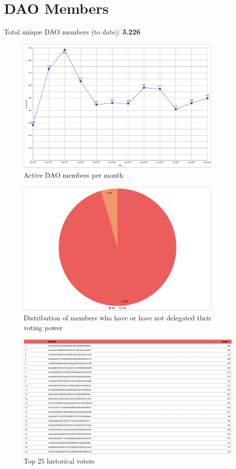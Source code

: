 \documentclass[MSE,Master,english]{twbook}%
\begin{document}
\section{DAO Members}
Total unique DAO members (to date): \textbf{3.226}

\begin{figure}[H]
  \centering
  \includegraphics[width=0.90\textwidth]{metrics/active_members.png}
  \caption{Active DAO members per month}
  \label{fig:active_members}
\end{figure}
\begin{figure}[H]
  \centering
  \includegraphics[width=0.90\textwidth]{metrics/delegation_ratio.png}
  \caption{Distribution of members who have or have not delegated their voting power}
  \label{fig:delegation_ratio}
\end{figure}
\begin{figure}[H]
  \centering
  \includegraphics[width=\textwidth]{metrics/top_voters.png}
  \caption{Top 25 historical voters}
  \label{fig:top_voters}
\end{figure}
\end{document}
